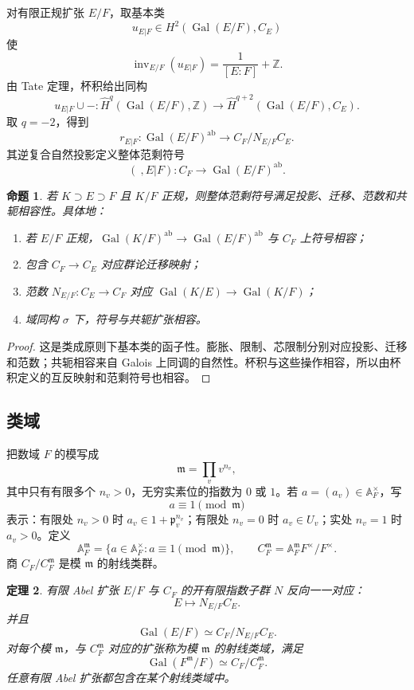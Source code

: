 \documentclass[11pt,a4paper,openany]{ctexbook}
\numberwithin{equation}{chapter}
\newcommand{\Z}{\mathbb{Z}}
\newcommand{\A}{\mathbb{A}}
\newcommand{\Gal}{\operatorname{Gal}}
\theoremstyle{plain}
\newtheorem{theorem}{定理}[chapter]
\newtheorem{proposition}[theorem]{命题}
\theoremstyle{definition}
\theoremstyle{remark}
\begin{document}
对有限正规扩张 $E/F$，取基本类
\[
u_{E|F}\in H^2(\Gal(E/F),C_E)
\]
使
\[
\operatorname{inv}_{E/F}(u_{E|F})=\frac1{[E:F]}+\Z.
\]
由 Tate 定理，杯积给出同构
\[
u_{E|F}\cup-:\widehat H^q(\Gal(E/F),\Z)\to
\widehat H^{q+2}(\Gal(E/F),C_E).
\]
取 $q=-2$，得到
\[
r_{E|F}:\Gal(E/F)^{\operatorname{ab}}\longrightarrow C_F/N_{E/F}C_E.
\]
其逆复合自然投影定义整体范剩符号
\[
(\ ,E|F):C_F\longrightarrow \Gal(E/F)^{\operatorname{ab}}.
\]

\begin{proposition}
若 $K\supset E\supset F$ 且 $K/F$ 正规，则整体范剩符号满足投影、迁移、范数和共轭相容性。具体地：
\begin{enumerate}
\item 若 $E/F$ 正规，$\Gal(K/F)^{\operatorname{ab}}\to\Gal(E/F)^{\operatorname{ab}}$ 与 $C_F$ 上符号相容；
\item 包含 $C_F\to C_E$ 对应群论迁移映射；
\item 范数 $N_{E/F}:C_E\to C_F$ 对应 $\Gal(K/E)\to\Gal(K/F)$；
\item 域同构 $\sigma$ 下，符号与共轭扩张相容。
\end{enumerate}
\end{proposition}

\begin{proof}
这是类成原则下基本类的函子性。膨胀、限制、芯限制分别对应投影、迁移和范数；共轭相容来自 Galois 上同调的自然性。杯积与这些操作相容，所以由杯积定义的互反映射和范剩符号也相容。
\end{proof}

\subsection{类域}

把数域 $F$ 的模写成
\[
\mathfrak m=\prod_v v^{n_v},
\]
其中只有有限多个 $n_v>0$，无穷实素位的指数为 $0$ 或 $1$。若 $a=(a_v)\in\A_F^\times$，写
\[
a\equiv1\pmod{\mathfrak m}
\]
表示：有限处 $n_v>0$ 时 $a_v\in1+\mathfrak p_v^{n_v}$；有限处 $n_v=0$ 时 $a_v\in U_v$；实处 $n_v=1$ 时 $a_v>0$。定义
\[
\A_F^{\mathfrak m}=\{a\in\A_F^\times:a\equiv1\pmod{\mathfrak m}\},
\qquad
C_F^{\mathfrak m}=\A_F^{\mathfrak m}F^\times/F^\times.
\]
商 $C_F/C_F^{\mathfrak m}$ 是模 $\mathfrak m$ 的射线类群。

\begin{theorem}
有限 Abel 扩张 $E/F$ 与 $C_F$ 的开有限指数子群 $N$ 反向一一对应：
\[
E\longmapsto N_{E/F}C_E.
\]
并且
\[
\Gal(E/F)\simeq C_F/N_{E/F}C_E.
\]
对每个模 $\mathfrak m$，与 $C_F^{\mathfrak m}$ 对应的扩张称为模 $\mathfrak m$ 的射线类域，满足
\[
\Gal(F^{\mathfrak m}/F)\simeq C_F/C_F^{\mathfrak m}.
\]
任意有限 Abel 扩张都包含在某个射线类域中。
\end{theorem}
\end{document}
